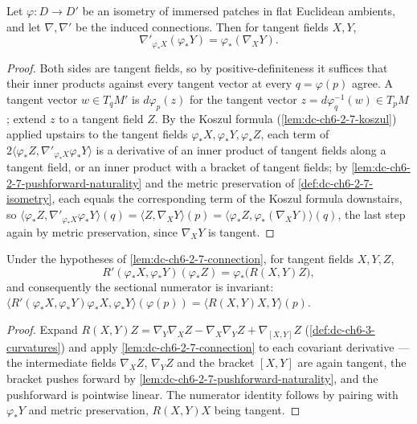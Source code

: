 \begin{lemma}
  \label{lem:dc-ch6-2-7-connection}
  \leanok
  Let $\varphi:D\to D'$ be an isometry of immersed patches in flat Euclidean
  ambients, and let $\nabla,\nabla'$ be the induced connections. Then for
  tangent fields $X,Y$,
  $$
  \nabla'_{\varphi_*X}(\varphi_*Y)=\varphi_*(\nabla_XY).
  $$
\end{lemma}
\begin{proof}
  \leanok
  \sketch
  Both sides are tangent fields, so by positive-definiteness it suffices that
  their inner products against every tangent vector at every $q=\varphi(p)$
  agree. A tangent vector $w\in T_qM'$ is $d\varphi_p(z)$ for the tangent
  vector $z=d\varphi^{-1}_q(w)\in T_pM$; extend $z$ to a tangent field $Z$.
  By the Koszul formula (\cref{lem:dc-ch6-2-7-koszul}) applied upstairs to
  the tangent fields $\varphi_*X,\varphi_*Y,\varphi_*Z$, each term of
  $2\langle\varphi_*Z,\nabla'_{\varphi_*X}\varphi_*Y\rangle$ is a
  derivative of an inner product of tangent fields along a tangent field, or
  an inner product with a bracket of tangent fields; by
  \cref{lem:dc-ch6-2-7-pushforward-naturality} and the metric preservation of
  \cref{def:dc-ch6-2-7-isometry}, each equals the corresponding term of the
  Koszul formula downstairs, so
  $\langle\varphi_*Z,\nabla'_{\varphi_*X}\varphi_*Y\rangle(q)
    =\langle Z,\nabla_XY\rangle(p)
    =\langle\varphi_*Z,\varphi_*(\nabla_XY)\rangle(q)$,
  the last step again by metric preservation, since $\nabla_XY$ is tangent.
\end{proof}

\begin{lemma}
  \label{lem:dc-ch6-2-7-curvature}
  \leanok
  Under the hypotheses of \cref{lem:dc-ch6-2-7-connection}, for tangent fields
  $X,Y,Z$,
  $$
  R'(\varphi_*X,\varphi_*Y)(\varphi_*Z)=\varphi_*\bigl(R(X,Y)Z\bigr),
  $$
  and consequently the sectional numerator is invariant:
  $\langle R'(\varphi_*X,\varphi_*Y)\varphi_*X,\varphi_*Y\rangle(\varphi(p))
    =\langle R(X,Y)X,Y\rangle(p)$.
\end{lemma}
\begin{proof}
  \leanok
  \sketch
  Expand $R(X,Y)Z=\nabla_Y\nabla_XZ-\nabla_X\nabla_YZ+\nabla_{[X,Y]}Z$
  (\cref{def:dc-ch6-3-curvatures}) and apply
  \cref{lem:dc-ch6-2-7-connection} to each covariant derivative — the
  intermediate fields $\nabla_XZ$, $\nabla_YZ$ and the bracket $[X,Y]$ are
  again tangent, the bracket pushes forward by
  \cref{lem:dc-ch6-2-7-pushforward-naturality}, and the pushforward is
  pointwise linear. The numerator identity follows by pairing with
  $\varphi_*Y$ and metric preservation, $R(X,Y)X$ being tangent.
\end{proof}

